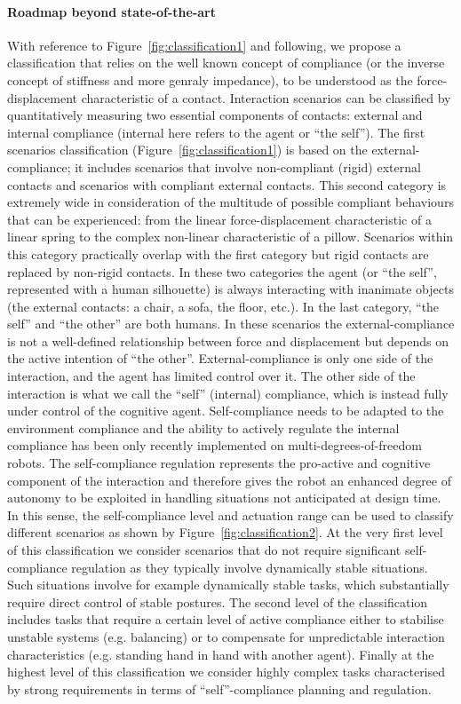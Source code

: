 \documentclass[final,5p,twocolumn]{elsarticle}
\begin{document}
\paragraph{Roadmap beyond state-of-the-art}

With reference to Figure~\ref{fig:classification1} and following, we propose a classification that relies on the well known concept of compliance (or the inverse concept of stiffness and more genraly impedance), to be understood as the force-displacement characteristic of a contact. Interaction scenarios can be classified by quantitatively measuring two essential components of contacts: external and internal compliance (internal here refers to the agent or ``the self''). The first scenarios classification (Figure~\ref{fig:classification1}) is based on the external-compliance; it includes scenarios that involve non-compliant (rigid) external contacts and scenarios with compliant external contacts. This second category is extremely wide in consideration of the multitude of possible compliant behaviours that can be experienced: from the linear force-displacement characteristic of a linear spring to the complex non-linear characteristic of a pillow. Scenarios within this category practically overlap with the first category but rigid contacts are replaced by non-rigid contacts. In these two categories the agent (or ``the self'', represented with a human silhouette) is always interacting with inanimate objects (the external contacts: a chair, a sofa, the floor, etc.). In the last category, ``the self'' and ``the other'' are both humans. In these scenarios the external-compliance is not a well-defined relationship between force and displacement but depends on the active intention of ``the other''.
External-compliance is only one side of the interaction, and the agent has limited control over it. The other side of the interaction is what we call the ``self'' (internal) compliance, which is instead fully under control of the cognitive agent. Self-compliance needs to be adapted to the environment compliance and the ability to actively regulate the internal compliance has been only recently implemented on multi-degrees-of-freedom robots. The self-compliance regulation represents the pro-active and cognitive component of the interaction and therefore gives the robot an enhanced degree of autonomy to be exploited in handling situations not anticipated at design time. In this sense, the self-compliance level and actuation range can be used to classify different scenarios as shown by Figure~\ref{fig:classification2}. At the very first level of this classification we consider scenarios that do not require significant self-compliance regulation as they typically involve dynamically stable situations. Such situations involve for example dynamically stable tasks, which substantially require direct control of stable postures. The second level of the classification includes tasks that require a certain level of active compliance either to stabilise unstable systems (e.g. balancing) or to compensate for unpredictable interaction characteristics (e.g. standing hand in hand with another agent). Finally at the highest level of this classification we consider highly complex tasks characterised by strong requirements in terms of ``self''-compliance planning and regulation.
\end{document}
